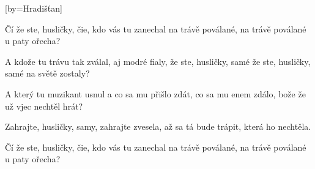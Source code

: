 [by={Hradišťan}]

\beginverse{}
\lrep{} Čí že ste, husličky, čie, kdo vás tu zanechal \rrep{}
na trávě poválané, na trávě poválané u paty ořecha?
\endverse{}

\beginverse*{}
  
\lrep{} A kdože tu trávu tak zválal, aj modré fialy, \rrep{}
že ste, husličky, samé že ste, husličky, samé na světě zostaly?
\endverse{}

\beginverse*{}
  
\endverse{}

\beginverse{}
\lrep{} A který tu muzikant usnul a co sa mu přišlo zdát, \rrep{}
\lrep{} co sa mu enem zdálo, bože \rrep{} že už vjec nechtěl hrát?
\endverse{}

\beginverse{}
\lrep{} Zahrajte, husličky, samy, zahrajte zvesela, \rrep{}
\lrep{} až sa tá bude trápit, \rrep{} která ho nechtěla.
\endverse{}

\beginverse{}
\lrep{} Čí že ste, husličky, čie, kdo vás tu zanechal \rrep{}
na trávě poválané, na trávě poválané u paty ořecha?
\endverse{}

\beginverse*{}
     
\endverse{}

\endsong{}
